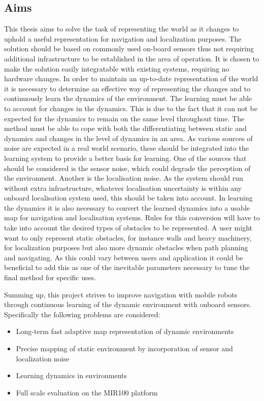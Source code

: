 \subsection{Aims}
This thesis aims to solve the task of representing the world as it changes to uphold a useful representation for navigation and localization purposes. 
The solution should be based on commonly used on-board sensors thus not requiring additional infrastructure to be established in the area of operation. 
It is chosen to make the solution easily integratable with existing systems, requiring no hardware changes. 
In order to maintain an up-to-date representation of the world it is necessary to determine an effective way of representing the changes and to continuously learn the dynamics of the environment. 
The learning must be able to account for changes in the dynamics. 
This is due to the fact that it can not be expected for the dynamics to remain on the same level throughout time. The method must be able to cope with both the differentiating between static and dynamics and changes in the level of dynamics in an area. 
As various sources of noise are expected in a real world scenario, these should be integrated into the learning system to provide a better basis for learning. One of the sources that should be considered is the sensor noise, which could degrade the perception of the environment. Another is the localisation noise.
As the system should run without extra infrastructure, whatever localisation uncertainty is within any onboard localisation system used, this should be taken into account.
In learning the dynamics it is also necessary to convert the learned dynamics into a usable map for navigation and localisation systems. Rules for this conversion will have to take into account the desired types of obstacles to be represented. 
A user might want to only represent static obstacles, for instance walls and heavy machinery, for localization purposes but also more dynamic obstacles when path planning and navigating. 
As this could vary between users and application it could be beneficial to add this as one of the inevitable parameters necessary to tune the final method for specific uses. 

Summing up, this project strives to improve navigation with mobile robots through continuous learning of the dynamic environment with onboard sensors. Specifically the following problems are considered:

\begin{itemize}
\item Long-term fast adaptive map representation of dynamic environments
\item Precise mapping of static environment by incorporation of sensor and localization noise
\item Learning dynamics in environments
\item Full scale evaluation on the MIR100 platform
\end{itemize}


